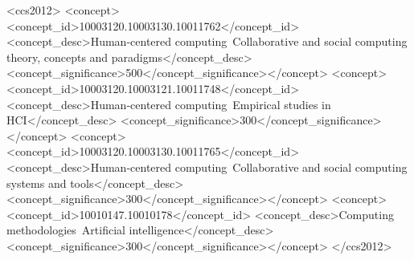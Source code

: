 \documentclass[acmsmall,screen,nonacm]{acmart}
\newcommand{\cd}{\textsf{CD}}
\begin{document}
\begin{abstract}
a requirements-probing variant already reaches $0.810$, and our detector, which counterfactually pins each
self-surfaced premise and clusters by executable equivalence, tops the axis at $0.895$ (95\% CI
$[0.815,0.966]$). It over-clarifies unambiguous prompts at a
model-dependent rate (pooled $0.402$). Used as a clarification gate with a simulated-user oracle
that supplies the missing convention, it cuts convergent delusion from \cd{} $0.626$ to $0.010$. This upper
bound holds when the missing convention is recoverable by someone in the loop: the detector localizes the
premise only weakly ($0.36$) and cannot supply the fix itself. Because people read agreement as confidence
and rarely register whether their sources are correlated, systems aggregating AI judgments should surface
\emph{evidential dependence}
(whether answers rest on the same, possibly incomplete, input) rather than an agent count.
\end{abstract}

\begin{CCSXML}
<ccs2012>
 <concept><concept_id>10003120.10003130.10011762</concept_id>
  <concept_desc>Human-centered computing~Collaborative and social computing theory, concepts and paradigms</concept_desc>
  <concept_significance>500</concept_significance></concept>
 <concept><concept_id>10003120.10003121.10011748</concept_id>
  <concept_desc>Human-centered computing~Empirical studies in HCI</concept_desc>
  <concept_significance>300</concept_significance></concept>
 <concept><concept_id>10003120.10003130.10011765</concept_id>
  <concept_desc>Human-centered computing~Collaborative and social computing systems and tools</concept_desc>
  <concept_significance>300</concept_significance></concept>
 <concept><concept_id>10010147.10010178</concept_id>
  <concept_desc>Computing methodologies~Artificial intelligence</concept_desc>
  <concept_significance>300</concept_significance></concept>
</ccs2012>
\end{CCSXML}

\end{document}
